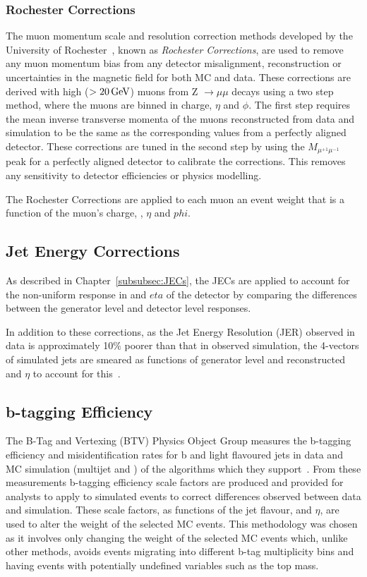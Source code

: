 \subsubsection{Rochester Corrections}
The muon momentum scale and resolution correction methods developed by the University of Rochester~\cite{rochester}, known as \emph{Rochester Corrections}, are used to remove any muon momentum bias from any detector misalignment, reconstruction or uncertainties in the magnetic field for both MC and data.
These corrections are derived with high \pt ($> 20\,\text{Ge\hspace{-.08em}V}$) muons from Z $ \rightarrow \mu\mu$ decays using a two step method, where the muons are binned in charge, $\eta$ and $\phi$.
The first step requires the mean inverse transverse momenta of the muons reconstructed from data and simulation to be the same as the corresponding values from a perfectly aligned detector.
These corrections are tuned in the second step by using the $M_{\mu^{+1}\mu^{-1}}$ peak for a perfectly aligned detector to calibrate the corrections.
This removes any sensitivity to detector efficiencies or physics modelling.

The Rochester Corrections are applied to each muon an event weight that is a function of the muon's charge, \pt, $\eta$ and $phi$.

\subsection{Jet Energy Corrections}\label{subsec:jesjer}
As described in Chapter~\ref{subsubsec:JECs}, the JECs are applied to account for the non-uniform response in \pT and $eta$ of the detector by comparing the differences between the generator level and detector level responses.

In addition to these corrections, as the Jet Energy Resolution (JER) observed in data is approximately 10\% poorer than that in observed simulation, the 4-vectors of simulated jets are smeared as functions of generator level and reconstructed \pt and $\eta$ to account for this~\cite{Khachatryan:2016kdb}.

\subsection{b-tagging Efficiency}\label{subsec:btagEff}
The B-Tag and Vertexing (BTV) Physics Object Group measures the b-tagging efficiency and misidentification rates for b and light flavoured jets in data and MC simulation (multijet and \ttbar) of the algorithms which they support~\cite{Sirunyan:2017ezt}.
From these measurements b-tagging efficiency scale factors are produced and provided for analysts to apply to simulated events to correct differences observed between data and simulation.
These scale factors, as functions of the jet flavour, \pT and $\eta$, are used to alter the weight of the selected MC events.
This methodology was chosen as it involves only changing the weight of the selected MC events which, unlike other methods, avoids events migrating into different b-tag multiplicity bins and having events with potentially undefined variables such as the top mass.


